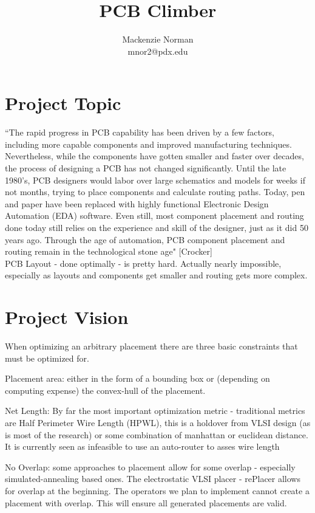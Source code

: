 \documentclass{article}
\title{PCB Climber}
\author{Mackenzie Norman\\ mnor2@pdx.edu}
\begin{document}
\maketitle
\section{Project Topic}

``The rapid progress in PCB capability has been driven by a few factors, including more capable components and improved manufacturing techniques. Nevertheless, while the components have gotten smaller and faster over decades, the process of designing a PCB has not changed significantly. Until the late 1980’s, PCB designers would labor over large schematics and models for weeks if not months, trying to place components and calculate routing paths. Today, pen and paper have been replaced with highly functional Electronic Design Automation (EDA) software. Even still, most component placement and routing done today still relies on the experience and skill of the designer, just as it did 50 years ago. Through the age of automation, PCB component placement and routing remain in the technological stone age" [Crocker]\\

PCB Layout - done optimally - is pretty hard. Actually nearly impossible, especially as layouts and components get smaller and routing gets more complex.  \\

\section{Project Vision}

When optimizing an arbitrary placement there are three basic constraints that must be optimized for.

Placement area: either in the form of a bounding box or (depending on computing expense) the convex-hull of the placement. 

Net Length: By far the most important optimization metric - traditional metrics are Half Perimeter Wire Length (HPWL), this is a holdover from VLSI design (as is most of the research) or some combination of manhattan or euclidean distance. It is currently seen as infeasible to use an auto-router to asses wire length

No Overlap: some approaches to placement allow for some overlap - especially simulated-annealing based ones. The electrostatic VLSI placer - rePlacer allows for overlap at the beginning. The operators we plan to implement cannot create a placement with overlap. This will ensure all generated placements are valid. 
\end{document}

